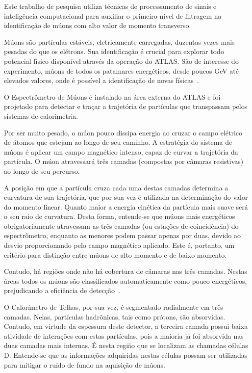 Este trabalho de pesquisa utiliza técnicas de processamento de sinais e
inteligência computacional para auxiliar o primeiro nível de filtragem na
identificação de múons com alto valor de momento transverso.

Múons são partículas estáveis, eletricamente carregadas, duzentas vezes mais
pesadas do que os elétrons. Sua  identificação é crucial para explorar todo
potencial físico disponível através da operação do ATLAS. São de interesse do
experimento, múons de todos os patamares energéticos, desde poucos GeV até
elevados valores, onde é possível a identificação de novas
físicas~\cite{HASSANI2007}.

O Espectrômetro de Múons é instalado na área externa do ATLAS e foi projetado
para detectar e traçar a trajetória de partículas que transpassam pelos sistemas
de calorimetria.

Por ser muito pesado, o múon pouco dissipa energia ao cruzar o campo elétrico de
átomos que estejam ao longo de seu caminho. A estratégia do sistema de múons é
aplicar um campo magnético intenso, capaz de curvar a trajetória da partícula.
O múon atravessará três camadas (compostas por câmaras resistivas)  ao longo de
seu percurso. 

A posição em que a partícula cruza cada uma destas camadas determina a curvatura
de sua trajetória, que por sua vez é utilizada na determinação do valor do
momento linear. Quanto maior a energia cinética da partícula mais suave será o
seu raio de curvatura. Desta forma, entende-se que múons mais energéticos
obrigatoriamente atravessam as três camadas (ou estações de coincidência) do
espectrômetro, enquanto as menores podem passar apenas por duas, devido ao
desvio proporcionando pelo campo magnético aplicado. Este é, portanto, um
critério para distinção entre múons de alto momento e de baixo momento.

Contudo, há regiões onde não há cobertura de câmaras nas três camadas. Nestas
áreas todos os múons são classificados automaticamente como pouco energéticos,
prejudicando a eficiência de detecção~\cite{ATLAS-CONF-2012-099}.

O Calorímetro de Telhas, por sua vez, é segmentado radialmente em três camadas.
Nelas, partículas hadrônicas, tais como prótons, são absorvidas. Contudo, em
virtude da espessura deste detector, a terceira camada possui baixa atividade de
interações com estas partículas, pois a maioria já foi absorvida nas duas
camadas mais internas. É nesta região que se localizam as chamadas células D.
Entende-se que as informações adquiridas nestas células  possam ser utilizadas
para mitigar o ruído de fundo na aquisição de múons.

